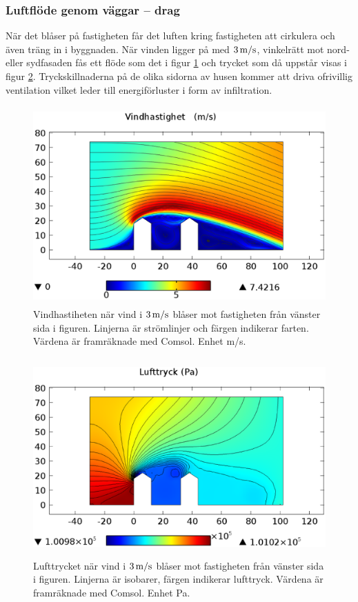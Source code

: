 \subsubsection{Luftflöde genom väggar – drag}

När det blåser på fastigheten får det luften kring fastigheten att cirkulera och även träng in i byggnaden. När vinden ligger på med $\unit[3]{m/s}$, vinkelrätt mot nord- eller sydfasaden fås ett flöde som det i figur \ref{fig:windspeed} och trycket som då uppstår visas i figur \ref{fig:windpressure}. Tryckskillnaderna på de olika sidorna av husen kommer att driva ofrivillig ventilation vilket leder till energiförluster i form av infiltration.

\begin{figure}[hpbt]
\centering
\includegraphics[width=127mm,height=76mm]{images/wind3mshdpi.eps}
\caption{\label{fig:windspeed}Vindhastiheten när vind i $\unit[3]{m/s}$ blåser mot fastigheten från vänster sida i figuren. Linjerna är strömlinjer och färgen indikerar farten. Värdena är framräknade med Comsol. Enhet m/s.}
\end{figure}


\begin{figure}[hpbt]
\centering
\includegraphics[width=127mm,height=76mm]{images/pressure3mshdpi.eps}

\caption{\label{fig:windpressure}Lufttrycket när vind i $\unit[3]{m/s}$ blåser mot fastigheten från vänster sida i figuren. Linjerna är isobarer, färgen indikerar lufttryck. Värdena är framräknade med Comsol. Enhet Pa.}
\end{figure}

